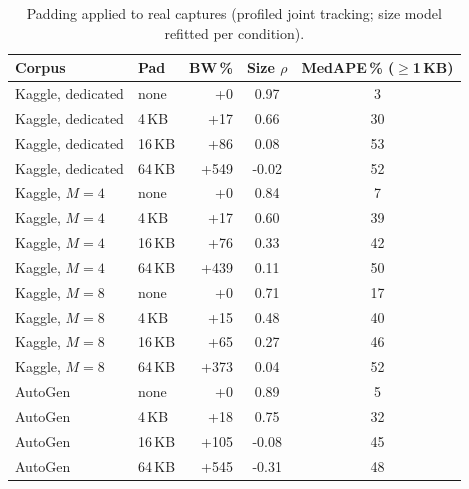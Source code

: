 \documentclass[journal]{IEEEtran}
\begin{document}
\begin{table}[t]\centering
\caption{Padding applied to real captures (profiled joint tracking; size model refitted per condition).}\label{tab:realpad}
\small\setlength{\tabcolsep}{3pt}
\begin{tabular}{llrcc}\toprule
Corpus & Pad & BW\,\% & Size $\rho$ & MedAPE\,\% ($\geq$1\,KB)\\\midrule
Kaggle, dedicated & none & +0 & 0.97 & 3 \\
Kaggle, dedicated & 4\,KB & +17 & 0.66 & 30 \\
Kaggle, dedicated & 16\,KB & +86 & 0.08 & 53 \\
Kaggle, dedicated & 64\,KB & +549 & -0.02 & 52 \\
Kaggle, $M{=}4$ & none & +0 & 0.84 & 7 \\
Kaggle, $M{=}4$ & 4\,KB & +17 & 0.60 & 39 \\
Kaggle, $M{=}4$ & 16\,KB & +76 & 0.33 & 42 \\
Kaggle, $M{=}4$ & 64\,KB & +439 & 0.11 & 50 \\
Kaggle, $M{=}8$ & none & +0 & 0.71 & 17 \\
Kaggle, $M{=}8$ & 4\,KB & +15 & 0.48 & 40 \\
Kaggle, $M{=}8$ & 16\,KB & +65 & 0.27 & 46 \\
Kaggle, $M{=}8$ & 64\,KB & +373 & 0.04 & 52 \\
AutoGen & none & +0 & 0.89 & 5 \\
AutoGen & 4\,KB & +18 & 0.75 & 32 \\
AutoGen & 16\,KB & +105 & -0.08 & 45 \\
AutoGen & 64\,KB & +545 & -0.31 & 48 \\
\bottomrule\end{tabular}\end{table}

\begin{table}[t]\centering
\caption{Defences on the testbed (attacker retrained per condition). BW: bandwidth overhead in \%. $^*$Streaming disabled, so its byte change is not comparable with the streamed conditions.}\label{tab:def}
\end{table}
\end{document}
